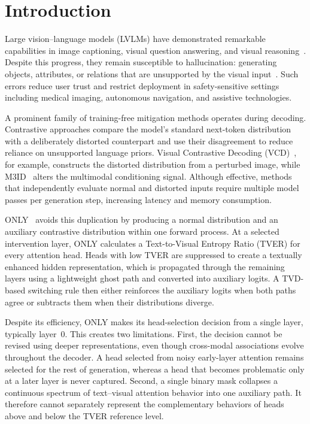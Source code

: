 \section{Introduction}
\label{sec:introduction}

Large vision--language models (LVLMs) have demonstrated remarkable capabilities in image captioning, visual question answering, and visual reasoning~\cite{alayrac2022flamingo,li2023blip2,liu2024visual}. Despite this progress, they remain susceptible to hallucination: generating objects, attributes, or relations that are unsupported by the visual input~\cite{rohrbach2018object,li2023pope}. Such errors reduce user trust and restrict deployment in safety-sensitive settings including medical imaging, autonomous navigation, and assistive technologies.

A prominent family of training-free mitigation methods operates during decoding. Contrastive approaches compare the model's standard next-token distribution with a deliberately distorted counterpart and use their disagreement to reduce reliance on unsupported language priors. Visual Contrastive Decoding (VCD)~\cite{leng2024mitigating}, for example, constructs the distorted distribution from a perturbed image, while M3ID~\cite{fayyaz2024m3id} alters the multimodal conditioning signal. Although effective, methods that independently evaluate normal and distorted inputs require multiple model passes per generation step, increasing latency and memory consumption.

ONLY~\cite{wan2025only} avoids this duplication by producing a normal distribution and an auxiliary contrastive distribution within one forward process. At a selected intervention layer, ONLY calculates a Text-to-Visual Entropy Ratio (TVER) for every attention head. Heads with low TVER are suppressed to create a textually enhanced hidden representation, which is propagated through the remaining layers using a lightweight ghost path and converted into auxiliary logits. A TVD-based switching rule then either reinforces the auxiliary logits when both paths agree or subtracts them when their distributions diverge.

Despite its efficiency, ONLY makes its head-selection decision from a single layer, typically layer~0. This creates two limitations. First, the decision cannot be revised using deeper representations, even though cross-modal associations evolve throughout the decoder. A head selected from noisy early-layer attention remains selected for the rest of generation, whereas a head that becomes problematic only at a later layer is never captured. Second, a single binary mask collapses a continuous spectrum of text--visual attention behavior into one auxiliary path. It therefore cannot separately represent the complementary behaviors of heads above and below the TVER reference level.

